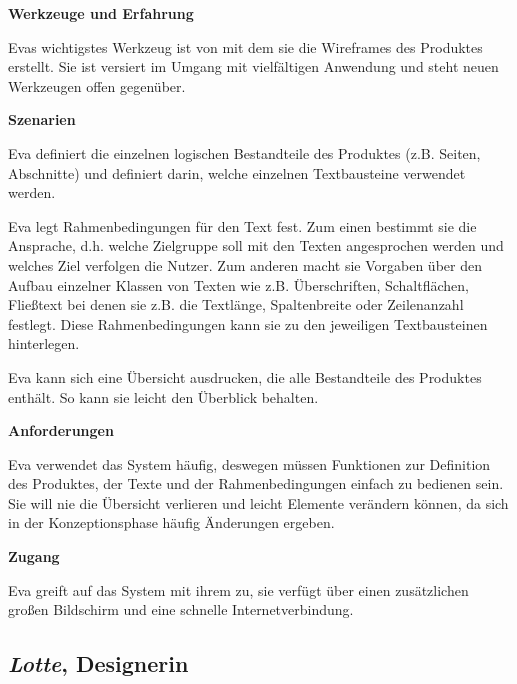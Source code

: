 \begin{multicols}{2}
\textbf{Werkzeuge und Erfahrung}

Evas wichtigstes Werkzeug ist  von  mit dem sie die Wireframes des Produktes erstellt. Sie ist versiert im Umgang mit vielfältigen Anwendung und steht neuen Werkzeugen offen gegenüber.

\columnbreak

\textbf{Szenarien}

Eva definiert die einzelnen logischen Bestandteile des Produktes (z.B. Seiten, Abschnitte) und definiert darin, welche einzelnen Textbausteine verwendet werden.

Eva legt Rahmenbedingungen für den Text fest. Zum einen bestimmt sie die Ansprache, d.h. welche Zielgruppe soll mit den Texten angesprochen werden und welches Ziel verfolgen die Nutzer. Zum anderen macht sie Vorgaben über den Aufbau einzelner Klassen von Texten wie z.B. Überschriften, Schaltflächen, Fließtext bei denen sie z.B. die Textlänge, Spaltenbreite oder Zeilenanzahl festlegt. Diese Rahmenbedingungen kann sie zu den jeweiligen Textbausteinen hinterlegen.

Eva kann sich eine Übersicht ausdrucken, die alle Bestandteile des Produktes enthält. So kann sie leicht den Überblick behalten.

\textbf{Anforderungen}

Eva verwendet das System häufig, deswegen müssen Funktionen zur Definition des Produktes, der Texte und der Rahmenbedingungen einfach zu bedienen sein. Sie will nie die Übersicht verlieren und leicht Elemente verändern können, da sich in der Konzeptionsphase häufig Änderungen ergeben. 

\textbf{Zugang}

Eva greift auf das System mit ihrem  zu, sie verfügt über einen zusätzlichen großen Bildschirm und eine schnelle Internetverbindung.

\end{multicols}

\pagebreak

\subsection{\emph{Lotte}, Designerin}\label{p:lotte}

